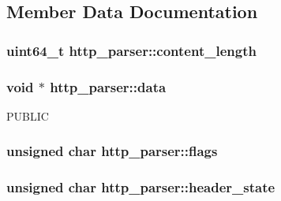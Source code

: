 \subsection{Member Data Documentation}
\hypertarget{structhttp__parser_a7fd5a194802b1206bb773e096d291f29}{}
\subsubsection[{content\+\_\+length}]{\setlength{\rightskip}{0pt plus 5cm}uint64\+\_\+t http\+\_\+parser\+::content\+\_\+length}\label{structhttp__parser_a7fd5a194802b1206bb773e096d291f29}
\hypertarget{structhttp__parser_ad4390e0a9448e02a19c4dffded033e3a}{}
\subsubsection[{data}]{\setlength{\rightskip}{0pt plus 5cm}void $\ast$ http\+\_\+parser\+::data}\label{structhttp__parser_ad4390e0a9448e02a19c4dffded033e3a}
P\+U\+B\+L\+I\+C \hypertarget{structhttp__parser_ad4f41ca1e40e3ee7de2fc74ad3f80dd5}{}
\subsubsection[{flags}]{\setlength{\rightskip}{0pt plus 5cm}unsigned char http\+\_\+parser\+::flags}\label{structhttp__parser_ad4f41ca1e40e3ee7de2fc74ad3f80dd5}
\hypertarget{structhttp__parser_a9d64389160150bfad8398140a38fe8e8}{}
\subsubsection[{header\+\_\+state}]{\setlength{\rightskip}{0pt plus 5cm}unsigned char http\+\_\+parser\+::header\+\_\+state}\label{structhttp__parser_a9d64389160150bfad8398140a38fe8e8}
\hypertarget{structhttp__parser_a098a1fdf277d5dadaa8e52f17d81c5e5}{}
